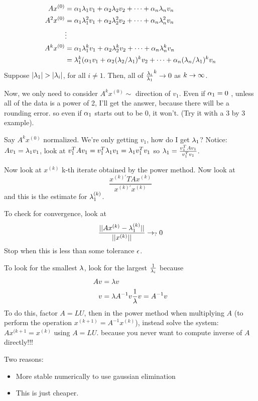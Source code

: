 \begin{align*}
Ax^{(0)}&= \alpha_1\lambda_1 v_1 + \alpha_2\lambda_2 v_2 + \cdots + \alpha_n\lambda_n
v_n\\
A^2x^{(0)}&= \alpha_1\lambda_1^2 v_1 + \alpha_2\lambda_2^2 v_2 + \cdots +
\alpha_n\lambda_n^2 v_n\\
&\vdots\\
A^kx^{(0)}&= \alpha_1\lambda_1^k v_1 + \alpha_2\lambda_2^k v_2 + \cdots +
\alpha_n\lambda_n^k v_n\\
&= \lambda_1^k (\alpha_1v_1 + \alpha_2(\lambda_2/\lambda_1)^k v_2 + \cdots + \alpha_n(\lambda_n/\lambda_1)^k v_n\\
\end{align*}
Suppose $|\lambda_1| > |\lambda_i|$, for all $i\neq 1$. Then, all of
$\frac{\lambda_i}{\lambda_1}^k \rightarrow 0$ as $k\rightarrow \infty$.

Now, we only need to consider $A^kx^{(0)} \sim $ direction of $v_1$.
Even if $\alpha_1=0$ , unless all of the data is a power of 2, I'll get
the answer, because there will be a rounding error. so even if
$\alpha_1$ starts out to be 0, it won't.
(Try it with a 3 by 3 example).

Say $A^kx^{(0)}$ normalized. We're only getting $v_1$, how do I get
$\lambda_1$?
Notice: $Av_1=\lambda_1v_1$, look at $v_1^TAv_1 = v_1^T\lambda_1v_1 =
\lambda_1v_1^Tv_1$
so $\lambda_1 = \frac{v_1^TAv_1}{v_1^Tv_1}$. 

Now look at $x^{(k)}$ k-th iterate obtained by the power method. Now
look at $$\frac{x^{(k)'}TAx^{(k)}}{x^{(k)'}x^{(k)}}$$ and this is the
estimate for $\lambda_1^{(k)}$.

To check for convergence, look
at $$\frac{||Ax^{(k)}-\lambda_1^{(k)}||}{||x^{(k)}||}\rightarrow_? 0$$
Stop when this is less than some tolerance $\epsilon$.

To look for the smallest $\lambda$, look for the largest
$\frac{1}{\lambda_i}$ because 
\begin{align*}
Av&=\lambda v\\
v &= \lambda A^{-1}v
\frac{1}{\lambda}v = A^{-1}v
\end{align*}
To do this, factor $A=LU$, then in the power method when multiplying
$A$ (to perform the operation $x^{(k+1)} = A^{-1}x^{(k)}$), instead
solve the system:
$Ax^{(k+1} = x^{(k)}$ using $A=LU$. because you never want to compute
inverse of $A$ directly!!!

Two reasons:
\begin{itemize}
\item More stable numerically to use gaussian elimination
\item This is just cheaper.
\end{itemize}


